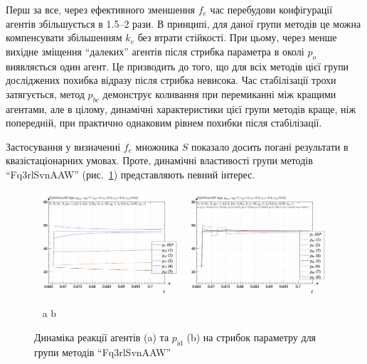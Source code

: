 Перш за все, через ефективного зменшення
$f_e$ час перебудови конфігурації агентів збільшується в 1.5--2
рази. В принципі, для даної групи методів це можна компенсувати
збільшенням
$k_e$ без втрати стійкості. При цьому, через менше вихідне
зміщення ``далеких'' агентів після стрибка параметра в околі
$p_o$ виявляється один агент. Це призводить до того, що для всіх
методів цієї групи досліджених похибка відразу після стрибка
невисока. Час стабілізації трохи затягується, метод
$p_{bc}$ демонструє коливання при перемиканні між кращими
агентами, але в цілому, динамічні характеристики цієї групи
методів краще, ніж попередній, при практично однаковим рівнем
похибки після стабілізації.

Застосування у визначенні
$f_e$ множника
$S$ показало досить погані результати в квазістаціонарних
умовах. Проте, динамічні властивості групи методів ``Fq3rlSvnAAW''
(рис.~\ref{atu:f:Fq3rlSvnAAW_sign}) представляють певний інтерес.

\begin{figure}[htb!]
  \begin{center}
    \includegraphics[width=0.48\textwidth]{p/sign/qls-p_t_pi_m_Fq3rlSvnAAW_sign.png}
    \hfill
    \includegraphics[width=0.48\textwidth]{p/sign/qls-p_t_p_m_Fq3rlSvnAAW_sign.png}
  \end{center}
  \vspace{-1.0ex}
  \begin{center}
    ~ \hfill a \hfill\hfill b  \hfill ~
  \end{center}
  \vspace{-1.5ex}
  \caption{Динаміка реакції агентів (a) та $p_\mathrm{id}$ (b) на стрибок параметру для групи методів ``Fq3rlSvnAAW''}
  \label{atu:f:Fq3rlSvnAAW_sign}
\end{figure}

